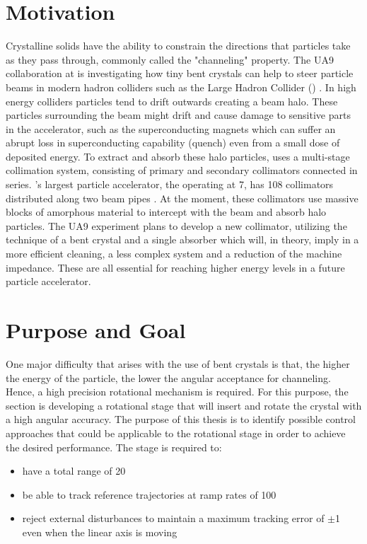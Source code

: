 \section{Motivation}
Crystalline solids have the ability to constrain the directions that particles take as they pass through, commonly called the "channeling" property. The UA9 collaboration at \abbrCERN is investigating how tiny bent crystals can help to steer particle beams in modern hadron colliders such as the Large Hadron Collider (\abbrLHC) \citep{scandale2016observation}. In high energy colliders particles tend to drift outwards creating a beam halo. These particles surrounding the beam might drift and cause damage to sensitive parts in the accelerator, such as the superconducting magnets which can suffer an abrupt loss in superconducting capability (quench) even from a small dose of deposited energy. To extract and absorb these halo particles, \abbrCERN uses a multi-stage collimation system, consisting of primary and secondary collimators connected in series. \abbrCERN's largest particle accelerator, the \abbrLHC operating at \unit{7}{\tera\electronvolt}, has 108 collimators distributed along two beam pipes \citep{CrystalCollimation:2015}. At the moment, these collimators use massive blocks of amorphous material to intercept with the beam and absorb halo particles. The UA9 experiment plans to develop a new collimator, utilizing the technique of a bent crystal and a single absorber which will, in theory, imply in a more efficient cleaning, a less complex system and a reduction of the machine impedance. These are all essential for reaching higher energy levels in a future particle accelerator.

\section{Purpose and Goal}
One major difficulty that arises with the use of bent crystals is that, the higher the energy of the particle, the lower the angular acceptance for channeling. Hence, a high precision rotational mechanism is required. For this purpose, the \abbrENSTIECE section is developing a rotational stage that will insert and rotate the crystal with a high angular accuracy. The purpose of this thesis is to identify possible control approaches that could be applicable to the rotational stage in order to achieve the desired performance. The stage is required to:
\begin{itemize}
  \item have a total range of \unit{20}{\milli\rad}
  \item be able to track reference trajectories at ramp rates of \unit{100}{\micro\radianpersecond}
  \item reject external disturbances to maintain a maximum tracking error of $\pm$\unit{1}{\micro\rad} even when the linear axis is moving
\end{itemize}

